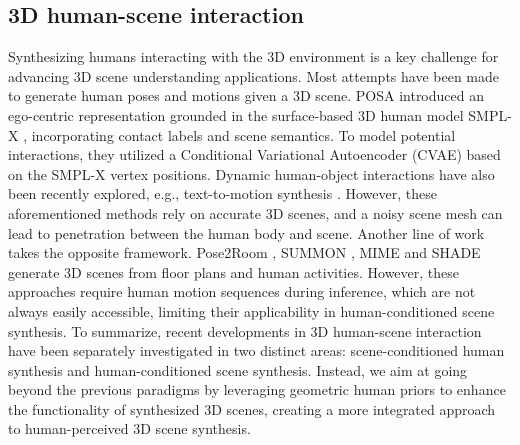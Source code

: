 \subsection{3D human-scene interaction} 
Synthesizing humans interacting with the 3D environment is a key challenge for advancing 3D scene understanding applications. Most attempts have been made to generate human poses and motions given a 3D scene. POSA \cite{hassan2021populating} introduced an ego-centric representation grounded in the surface-based 3D human model SMPL-X \cite{pavlakos2019expressive}, incorporating contact labels and scene semantics. To model potential interactions, they utilized a Conditional Variational Autoencoder (CVAE) based on the SMPL-X vertex positions. 
Dynamic human-object interactions have also been recently explored, e.g., text-to-motion synthesis \cite{li2024controllable, yi2024generating}. However, these aforementioned methods rely on accurate 3D scenes, and a noisy scene mesh can lead to penetration between the human body and scene. Another line of work takes the opposite framework. Pose2Room \cite{nie2022pose2room}, SUMMON \cite{ye2022scene}, MIME \cite{yi2023mime} and SHADE \cite{hong2024human} generate 3D scenes from floor plans and human activities. However, these approaches require human motion sequences during inference, which are not always easily accessible, limiting their applicability in human-conditioned scene synthesis. To summarize, recent developments in 3D human-scene interaction have been separately investigated in two distinct areas: scene-conditioned human synthesis and human-conditioned scene synthesis. Instead, we aim at going beyond the previous paradigms by leveraging geometric human priors to enhance the functionality of synthesized 3D scenes, creating a more integrated approach to human-perceived 3D scene synthesis.